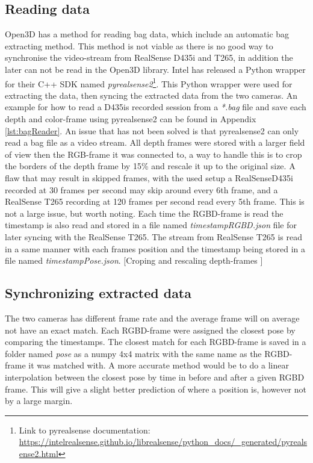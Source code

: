 
\subsection{Reading data}

Open3D has a method for reading bag data, which include an automatic bag extracting method. This method is not viable as there is no good way to synchronise the video-stream from RealSense D435i and T265, in addition the later can not be read in the Open3D library. Intel has released a Python wrapper for their C++ SDK named \textit{pyrealsense2}\footnote{Link to pyrealsense documentation: \url{https://intelrealsense.github.io/librealsense/python_docs/_generated/pyrealsense2.html}}. This Python wrapper were used for extracting the data, then syncing the extracted data from the two cameras. An example for how to read a D435is recorded session from a \textit{*.bag} file and save each depth and color-frame using pyrealsense2 can be found in Appendix \ref{lst:bagReader}. An issue that has not been solved is that pyrealsense2 can only read a bag file as a video stream. All depth frames were stored with a larger field of view then the RGB-frame it was connected to, a way to handle this is to crop the borders of the depth frame by 15\% and rescale it up to the original size. A flaw that may result in skipped frames, with the used setup a RealSenseD435i recorded at 30 frames per second may skip around every 6th frame, and a RealSense T265 recording at 120 frames per second read every 5th frame. This is not a large issue, but worth noting. Each time the RGBD-frame is read the timestamp is also read and stored in a file named \textit{timestampRGBD.json} file for later syncing with the RealSense T265. The stream from RealSense T265 is read in a same manner with each frames position and the timestamp being stored in a file named \textit{timestampPose.json}. [Croping and rescaling depth-frames ]

\subsection{Synchronizing extracted data}
The two cameras has different frame rate and the average frame will on average not have an exact match. Each RGBD-frame were assigned the closest pose by comparing the timestamps. The closest match for each RGBD-frame is saved in a folder named \textit{pose} as a numpy 4x4 matrix with the same name as the RGBD-frame it was matched with. A more accurate method would be to do a linear interpolation between the closest pose by time in before and after a given RGBD frame. This will give a slight better prediction of where a position is, however not by a large margin.

